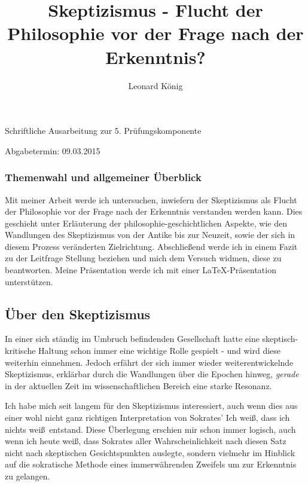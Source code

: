 \documentclass[12pt,a4paper,final]{article}
\title{Skeptizismus - Flucht der Philosophie vor der Frage nach der Erkenntnis?}
\author{Leonard König}
\begin{document}
\maketitle
\begin{Large}
\begin{center}
Schriftliche Ausarbeitung zur 5. Prüfungskomponente
\end{center}
\end{Large}
\vspace{100pt}
\begin{Large}
\begin{center}
Abgabetermin: 09.03.2015
\end{center}
\end{Large}
\pagebreak
%
\setcounter{page}{2}
%
\subsubsection*{Themenwahl und allgemeiner Überblick}
Mit meiner Arbeit werde ich untersuchen, inwiefern der Skeptizismus als Flucht der Philosophie vor der Frage nach der Erkenntnis verstanden werden kann. Dies geschieht unter Erläuterung der philosophie-geschichtlichen Aspekte, wie den Wandlungen des Skeptizismus von der Antike bis zur Neuzeit, sowie der sich in diesem Prozess veränderten Zielrichtung. Abschließend werde ich in einem Fazit zu der Leitfrage Stellung beziehen und mich dem Versuch widmen, diese zu beantworten. Meine Präsentation werde ich mit einer \LaTeX -Präsentation unterstützen.
%
\subsection*{Über den Skeptizismus}
In einer sich ständig im Umbruch befindenden Gesellschaft hatte eine skeptisch-kritische Haltung schon immer eine wichtige Rolle gespielt - und wird diese weiterhin einnehmen. Jedoch erfährt der sich immer wieder weiterentwickelnde Skeptizismus, erklärbar durch die Wandlungen über die Epochen hinweg, \emph{gerade} in der aktuellen Zeit im wissenschaftlichen Bereich eine starke Resonanz.

Ich habe mich seit langem für den Skeptizismus interessiert, auch wenn dies aus einer wohl nicht ganz richtigen Interpretation von Sokrates' \glqq Ich weiß, dass ich nichts weiß\grqq\ entstand. Diese Überlegung erschien mir schon immer logisch, auch wenn ich heute weiß, dass Sokrates aller Wahrscheinlichkeit nach diesen Satz nicht nach skeptischen Gesichtspunkten auslegte, sondern vielmehr im Hinblick auf die sokratische Methode eines immerwährenden Zweifels um zur Erkenntnis zu gelangen.
\end{document}
